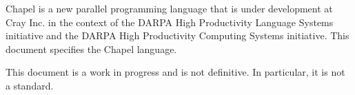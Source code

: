 \label{Scope}

Chapel is a new parallel programming language that is under
development at Cray Inc. in the context of the DARPA High Productivity
Language Systems initiative and the DARPA High Productivity Computing
Systems initiative.  This document specifies the Chapel language.

This document is a work in progress and is not definitive.  In
particular, it is not a standard.
